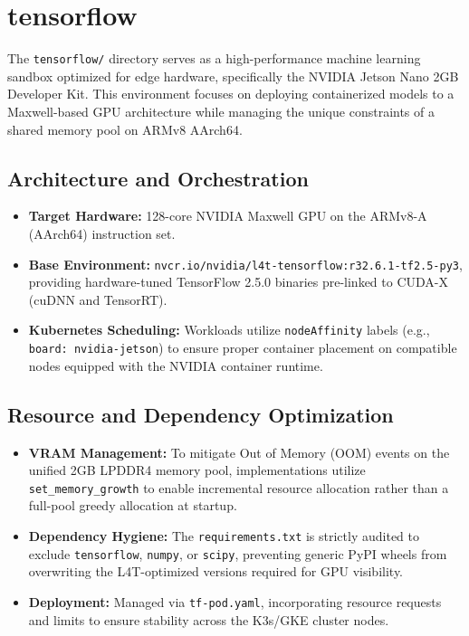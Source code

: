 \section{tensorflow}
The \texttt{tensorflow/} directory serves as a high-performance machine learning sandbox optimized for edge hardware, specifically the NVIDIA Jetson Nano 2GB Developer Kit. This environment focuses on deploying containerized models to a Maxwell-based GPU architecture while managing the unique constraints of a shared memory pool on ARMv8 AArch64.

\subsection*{Architecture and Orchestration}
\begin{itemize}
    \item \textbf{Target Hardware:} 128-core NVIDIA Maxwell GPU on the ARMv8-A (AArch64) instruction set.
    \item \textbf{Base Environment:} \texttt{nvcr.io/nvidia/l4t-tensorflow:r32.6.1-tf2.5-py3}, providing hardware-tuned TensorFlow 2.5.0 binaries pre-linked to CUDA-X (cuDNN and TensorRT).
    \item \textbf{Kubernetes Scheduling:} Workloads utilize \texttt{nodeAffinity} labels (e.g., \texttt{board: nvidia-jetson}) to ensure proper container placement on compatible nodes equipped with the NVIDIA container runtime.
\end{itemize}

\subsection*{Resource and Dependency Optimization}
\begin{itemize}
    \item \textbf{VRAM Management:} To mitigate Out of Memory (OOM) events on the unified 2GB LPDDR4 memory pool, implementations utilize \texttt{set\_memory\_growth} to enable incremental resource allocation rather than a full-pool greedy allocation at startup.
    \item \textbf{Dependency Hygiene:} The \texttt{requirements.txt} is strictly audited to exclude \texttt{tensorflow}, \texttt{numpy}, or \texttt{scipy}, preventing generic PyPI wheels from overwriting the L4T-optimized versions required for GPU visibility.
    \item \textbf{Deployment:} Managed via \texttt{tf-pod.yaml}, incorporating resource requests and limits to ensure stability across the K3s/GKE cluster nodes.
\end{itemize}
